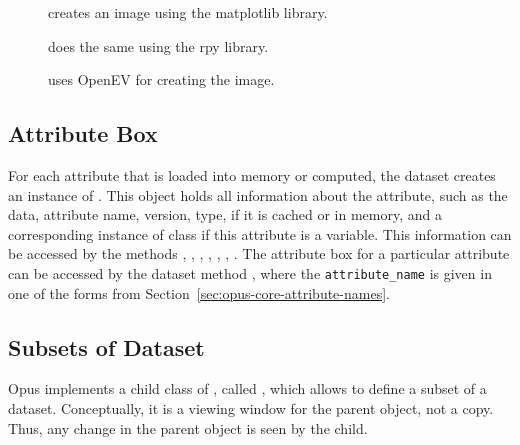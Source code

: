 \begin{description}
\item[] creates an image using the matplotlib \matplotlibindex
library.
\item[] \rindex does the same using the rpy \rpyindex
library.
\item[] \openevindex uses OpenEV \openevindex for creating the
  image.
\end{description}

\subsection{Attribute Box}
\label{sec:attribute-box}
%
For each attribute \attributesindex that is loaded into memory or computed, the dataset \datasetindex creates
an instance of . \attributesindex This object holds all information
about the attribute, \attributesindex such as the data, attribute \attributesindex name, 
version, type, if it is cached or in memory, and a corresponding
instance of class  \variablesindex if this attribute \attributesindex is a variable. \variablesindex This
information can be accessed by the  \attributesindex methods
, , \variablesindex {},
, , ,
. \variablesindex The attribute \attributesindex box for a particular attribute \attributesindex
can be accessed by the dataset \datasetindex method
, \attributesindex where the \verb|attribute_name| \attributesindex is
given in one of the  forms from Section~\ref{sec:opus-core-attribute-names}.

\subsection{Subsets of Dataset}
\datasetindex\datasetsubsetindex
%
Opus implements a child class of , \datasetindex called , \datasetsubsetindex
which allows to define a subset of a dataset. \datasetindex\datasetsubsetindex Conceptually, it is a viewing
window for the parent  \datasetindex object, not a copy. Thus, any change in
the parent object is seen by the child.

